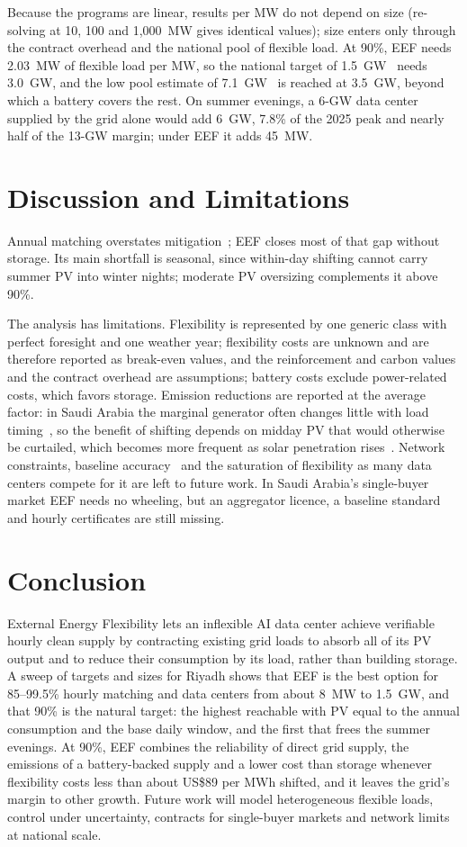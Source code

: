 \documentclass[conference]{IEEEtran}
\begin{document}
Because the programs are linear, results per MW do not depend on size (re-solving at 10, 100 and 1{,}000~MW gives identical values); size enters only through the contract overhead and the national pool of flexible load. At 90\%, EEF needs 2.03~MW of flexible load per MW, so the national target of 1.5~GW~\cite{r52} needs 3.0~GW, and the low pool estimate of 7.1~GW~\cite{r23} is reached at 3.5~GW, beyond which a battery covers the rest. On summer evenings, a 6-GW data center supplied by the grid alone would add 6~GW, 7.8\% of the 2025 peak and nearly half of the 13-GW margin; under EEF it adds 45~MW.

\section{Discussion and Limitations}
Annual matching overstates mitigation~\cite{r12}; EEF closes most of that gap without storage. Its main shortfall is seasonal, since within-day shifting cannot carry summer PV into winter nights; moderate PV oversizing complements it above 90\%.

The analysis has limitations. Flexibility is represented by one generic class with perfect foresight and one weather year; flexibility costs are unknown and are therefore reported as break-even values, and the reinforcement and carbon values and the contract overhead are assumptions; battery costs exclude power-related costs, which favors storage. Emission reductions are reported at the average factor: in Saudi Arabia the marginal generator often changes little with load timing~\cite{r38}, so the benefit of shifting depends on midday PV that would otherwise be curtailed, which becomes more frequent as solar penetration rises~\cite{r23,r44}. Network constraints, baseline accuracy~\cite{r45} and the saturation of flexibility as many data centers compete for it are left to future work. In Saudi Arabia's single-buyer market EEF needs no wheeling, but an aggregator licence, a baseline standard and hourly certificates are still missing.

\section{Conclusion}
External Energy Flexibility lets an inflexible AI data center achieve verifiable hourly clean supply by contracting existing grid loads to absorb all of its PV output and to reduce their consumption by its load, rather than building storage. A sweep of targets and sizes for Riyadh shows that EEF is the best option for 85--99.5\% hourly matching and data centers from about 8~MW to 1.5~GW, and that 90\% is the natural target: the highest reachable with PV equal to the annual consumption and the base daily window, and the first that frees the summer evenings. At 90\%, EEF combines the reliability of direct grid supply, the emissions of a battery-backed supply and a lower cost than storage whenever flexibility costs less than about US\$89 per MWh shifted, and it leaves the grid's margin to other growth. Future work will model heterogeneous flexible loads, control under uncertainty, contracts for single-buyer markets and network limits at national scale.



\end{document}
